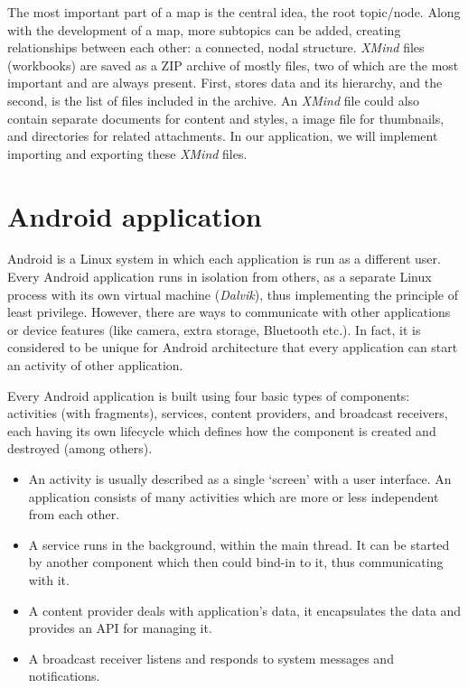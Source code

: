 The most important part of a map is the central idea, the root topic/node. Along with the development of a map, more subtopics can be added, creating relationships between each other: a connected, nodal structure. {\em XMind} files (workbooks) are saved as a ZIP archive of mostly  files, two of which are the most important and are always present. First,  stores data and its hierarchy, and the second,  is the list of files included in the archive. An {\em XMind} file could also contain separate  documents for content and styles, a  image file for thumbnails, and directories for related attachments. \cite{XMind:2009:Format} In our application, we will implement importing and exporting these {\em XMind} files.

\section{Android application}
\label{androidsdk}

Android is a Linux system in which each application is run as a different user. Every Android application runs in isolation from others, as a separate Linux process with its own virtual machine ({\em Dalvik}), thus implementing the principle of least privilege. However,  there are ways to communicate with other applications or device features (like camera, extra storage, Bluetooth etc.). In fact, it is considered to be unique for Android architecture that every application can start an activity of other application.

Every Android application is built using four basic types of components: activities (with fragments), services, content providers, and broadcast receivers, each having its own lifecycle which defines how the component is created and destroyed (among others).

\begin{itemize}
	\item An activity is usually described as a single `screen' with a user interface. An application consists of many activities which are more or less independent from each other.
	\item A service runs in the background, within the main thread. It can be started by another component which then could bind-in to it, thus communicating with it.
	\item A content provider deals with application's data, it encapsulates the data and provides an API for managing it.
	\item A broadcast receiver listens and responds to system messages and notifications.
\end{itemize}

